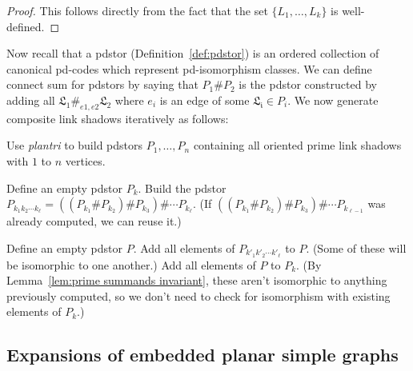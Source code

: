 \documentclass[amsmath,secnumarabic,floatfix,amssymb,nofootinbib,nobibnotes,letterpaper,11pt,tightenlines,showkeys]{revtex4}
\theoremstyle{definition}
\begin{document}
\begin{proof} This follows directly from the fact that the set $\{L_1, \dots, L_k\}$ is well-defined. \end{proof}

Now recall that a pdstor (Definition~\ref{def:pdstor}) is an ordered collection of canonical pd-codes which represent pd-isomorphism classes. We can define connect sum for pdstors by saying that $P_1 \# P_2$ is the pdstor constructed by adding all $\mathfrak{L_1} \#_{e1,e2} \mathfrak{L_2}$ where $e_i$ is an edge of some $\mathfrak{L_i} \in P_i$. We now generate composite link shadows iteratively as follows:

\begin{algorithm}
\begin{algorithmic}

\State Use \emph{plantri} to build pdstors $P_1, \dots, P_n$ containing all oriented prime link shadows with $1$ to $n$ vertices.

 	
 \State Define an empty pdstor $P_k$.
    \State  Build the pdstor $P_{k_1k_2\cdots k_\ell} = ((P_{k_1} \# P_{k_2}) \# P_{k_3}) \# \cdots P_{k_\ell}$.
    \State  (If $((P_{k_1} \# P_{k_2}) \# P_{k_3}) \# \cdots P_{k_{\ell-1}}$ was already computed, we can reuse it.)
 \EndFor

    \State Define an empty pdstor $P$.
       \State Add all elements of $P_{k'_1k'_2\cdots k'_\ell}$ to $P$.
      \State (Some of these will be isomorphic to one another.) 
    \EndFor
    \State Add all elements of $P$ to $P_k$. 
    \State (By Lemma~\ref{lem:prime summands invariant}, these aren't isomorphic to anything previously computed,
    \State so we don't need to check for isomorphism with existing elements of $P_k$.)
 \EndFor

\EndFor      
\EndProcedure
\end{algorithmic}
\end{algorithm}

\subsection{Expansions of embedded planar simple graphs}
\end{document}
